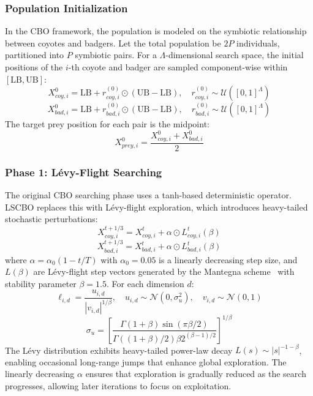 \documentclass[pdflatex,onecolumn,sn-mathphys-num]{sn-jnl}
\begin{document}
\subsubsection{Population Initialization}
In the CBO framework, the population is modeled on the symbiotic relationship between coyotes and badgers. Let the total population be $2P$ individuals, partitioned into $P$ symbiotic pairs. For a $\Lambda$-dimensional search space, the initial positions of the $i$-th coyote and badger are sampled component-wise within $[\text{LB}, \text{UB}]$:
\begin{equation}
X_{coy, i}^{0} = \text{LB} + r_{coy,i}^{(0)} \odot (\text{UB} - \text{LB}), \quad r_{coy,i}^{(0)} \sim \mathcal{U}([0,1]^{\Lambda})
\end{equation}
\begin{equation}
X_{bad, i}^{0} = \text{LB} + r_{bad,i}^{(0)} \odot (\text{UB} - \text{LB}), \quad r_{bad,i}^{(0)} \sim \mathcal{U}([0,1]^{\Lambda})
\end{equation}
The target prey position for each pair is the midpoint:
\begin{equation}
X_{prey, i}^{0} = \frac{X_{coy, i}^{0} + X_{bad, i}^{0}}{2}
\end{equation}

\subsubsection{Phase 1: L\'{e}vy-Flight Searching}
The original CBO searching phase uses a tanh-based deterministic operator. LSCBO replaces this with L\'{e}vy-flight exploration, which introduces heavy-tailed stochastic perturbations:
\begin{equation}
X_{coy, i}^{t+1/3} = X_{coy, i}^t + \alpha \odot L_{coy,i}^{t}(\beta)
\end{equation}
\begin{equation}
X_{bad, i}^{t+1/3} = X_{bad, i}^t + \alpha \odot L_{bad,i}^{t}(\beta)
\end{equation}
where $\alpha = \alpha_0(1 - t/T)$ with $\alpha_0 = 0.05$ is a linearly decreasing step size, and $L(\beta)$ are L\'{e}vy-flight step vectors generated by the Mantegna scheme~\cite{Mantegna1994} with stability parameter $\beta = 1.5$. For each dimension $d$:
\begin{equation}
\ell_{i,d} = \frac{u_{i,d}}{|v_{i,d}|^{1/\beta}}, \quad u_{i,d}\sim\mathcal{N}(0,\sigma_u^2), \quad v_{i,d}\sim\mathcal{N}(0,1)
\end{equation}
\begin{equation}
\sigma_u = \left[\frac{\Gamma(1+\beta)\sin(\pi\beta/2)}{\Gamma((1+\beta)/2)\beta 2^{(\beta-1)/2}}\right]^{1/\beta}
\end{equation}
The L\'{e}vy distribution exhibits heavy-tailed power-law decay $L(s) \sim |s|^{-1-\beta}$, enabling occasional long-range jumps that enhance global exploration. The linearly decreasing $\alpha$ ensures that exploration is gradually reduced as the search progresses, allowing later iterations to focus on exploitation.
\end{document}
